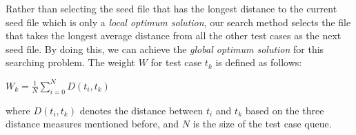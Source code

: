 Rather than selecting the seed file that has the longest distance to the current seed file which is only a \emph{local optimum solution}, our search method selects the file that takes the longest average distance from all the other test cases as the next seed file. By doing this, we can achieve the \emph{global optimum solution} for this searching problem. The weight $W$ for test case $t_k$ is defined as follows:

\begin{center}
$W_k = \displaystyle\frac{1}{N} \sum_{i=0}^{N} D(t_i, t_k)$
\end{center}

where $D(t_i, t_k)$ denotes the distance between $t_i$ and $t_k$ based on the three distance measures mentioned before, and $N$ is the size of the test case queue. 